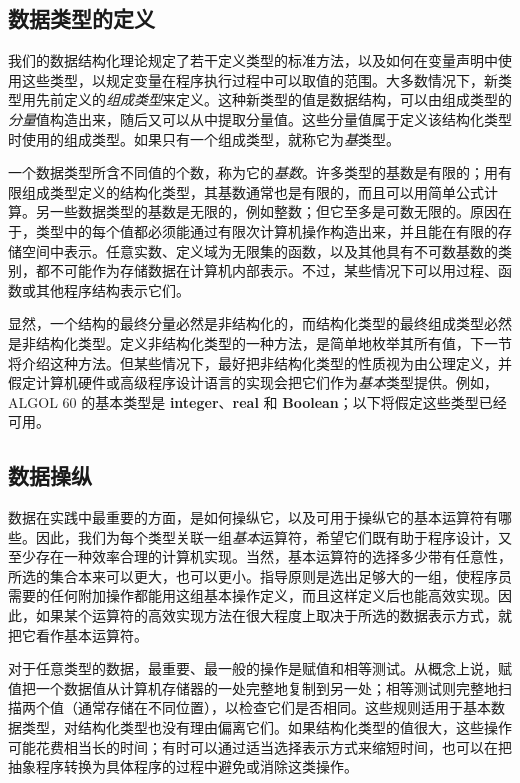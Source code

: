 \subsection{数据类型的定义}

我们的数据结构化理论规定了若干定义类型的标准方法，以及如何在变量声明中使用这些类型，以规定变量在程序执行过程中可以取值的范围。大多数情况下，新类型用先前定义的\textit{组成类型}来定义。这种新类型的值是数据结构，可以由组成类型的\textit{分量}值构造出来，随后又可以从中提取分量值。这些分量值属于定义该结构化类型时使用的组成类型。如果只有一个组成类型，就称它为\textit{基}类型。

一个数据类型所含不同值的个数，称为它的\textit{基数}。许多类型的基数是有限的；用有限组成类型定义的结构化类型，其基数通常也是有限的，而且可以用简单公式计算。另一些数据类型的基数是无限的，例如整数；但它至多是可数无限的。原因在于，类型中的每个值都必须能通过有限次计算机操作构造出来，并且能在有限的存储空间中表示。任意实数、定义域为无限集的函数，以及其他具有不可数基数的类别，都不可能作为存储数据在计算机内部表示。不过，某些情况下可以用过程、函数或其他程序结构表示它们。

显然，一个结构的最终分量必然是非结构化的，而结构化类型的最终组成类型必然是非结构化类型。定义非结构化类型的一种方法，是简单地枚举其所有值，下一节将介绍这种方法。但某些情况下，最好把非结构化类型的性质视为由公理定义，并假定计算机硬件或高级程序设计语言的实现会把它们作为\textit{基本}类型提供。例如，ALGOL 60 的基本类型是 \textbf{integer}、\textbf{real} 和 \textbf{Boolean}；以下将假定这些类型已经可用。

\subsection{数据操纵}

数据在实践中最重要的方面，是如何操纵它，以及可用于操纵它的基本运算符有哪些。因此，我们为每个类型关联一组\textit{基本}运算符，希望它们既有助于程序设计，又至少存在一种效率合理的计算机实现。当然，基本运算符的选择多少带有任意性，所选的集合本来可以更大，也可以更小。指导原则是选出足够大的一组，使程序员需要的任何附加操作都能用这组基本操作定义，而且这样定义后也能高效实现。因此，如果某个运算符的高效实现方法在很大程度上取决于所选的数据表示方式，就把它看作基本运算符。

对于任意类型的数据，最重要、最一般的操作是赋值和相等测试。从概念上说，赋值把一个数据值从计算机存储器的一处完整地复制到另一处；相等测试则完整地扫描两个值（通常存储在不同位置），以检查它们是否相同。这些规则适用于基本数据类型，对结构化类型也没有理由偏离它们。如果结构化类型的值很大，这些操作可能花费相当长的时间；有时可以通过适当选择表示方式来缩短时间，也可以在把抽象程序转换为具体程序的过程中避免或消除这类操作。

